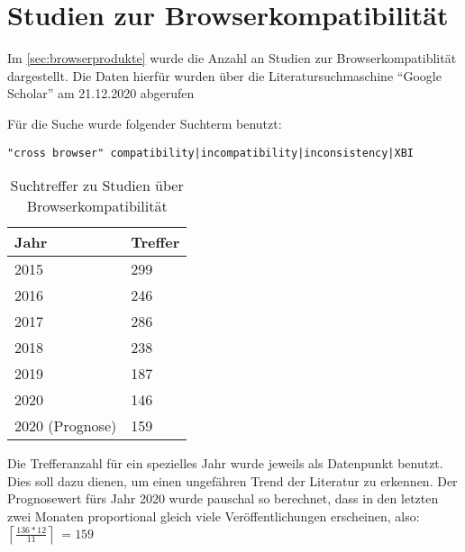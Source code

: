 \section{Studien zur Browserkompatibilität}
\label{sec:studien-zur-browser-kompatibilitaet}

Im \autoref{sec:browserprodukte} wurde die Anzahl an Studien zur Browserkompatiblität dargestellt. Die Daten hierfür wurden über die Literatursuchmaschine \enquote{Google Scholar} am 21.12.2020 abgerufen

Für die Suche wurde folgender Suchterm benutzt:
\begin{verbatim}
"cross browser" compatibility|incompatibility|inconsistency|XBI
\end{verbatim}

\begin{wraptable}[12]{r}{0.4\linewidth}
\centering
\begin{tabular}{|l|l|}
  \hline
  Jahr & Treffer \\
  \hline
  2015 & 299 \\
  \hline
  2016 & 246 \\
  \hline
  2017 & 286 \\
  \hline
  2018 & 238 \\
  \hline
  2019 & 187 \\
  \hline
  2020 & 146 \\
  \hline
  2020 (Prognose) & 159 \\
  \hline
\end{tabular}
\caption{Suchtreffer zu Studien über Browserkompatibilität}
\end{wraptable}

\def\lc{\left\lceil}   
\def\rc{\right\rceil}

Die Trefferanzahl für ein spezielles Jahr wurde jeweils als Datenpunkt benutzt. Dies soll dazu dienen, um einen ungefähren Trend der Literatur zu erkennen. Der Prognosewert fürs Jahr 2020 wurde pauschal so berechnet, dass in den letzten zwei Monaten proportional gleich viele Veröffentlichungen erscheinen, also: \( \lc \frac{136 * 12}{11} \rc\ = 159 \)